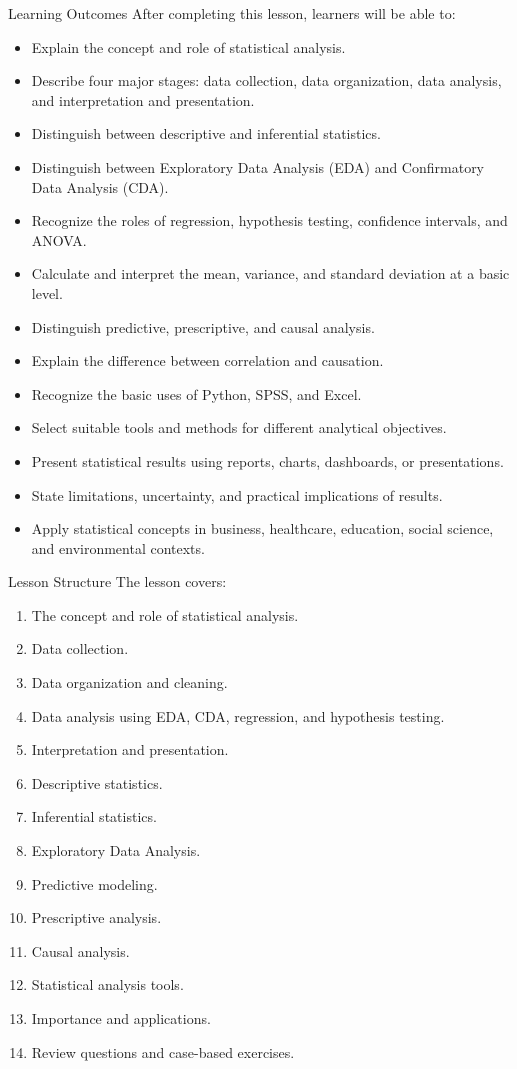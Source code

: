 \documentclass[aspectratio=169,11pt]{beamer}
\begin{document}
\begin{frame}[allowframebreaks]{Learning Outcomes}
\footnotesize
After completing this lesson, learners will be able to:\par\medskip
\begin{itemize}
\item Explain the concept and role of statistical analysis.
\item Describe four major stages: data collection, data organization, data analysis, and interpretation and presentation.
\item Distinguish between descriptive and inferential statistics.
\item Distinguish between Exploratory Data Analysis (EDA) and Confirmatory Data Analysis (CDA).
\item Recognize the roles of regression, hypothesis testing, confidence intervals, and ANOVA.
\item Calculate and interpret the mean, variance, and standard deviation at a basic level.
\item Distinguish predictive, prescriptive, and causal analysis.
\item Explain the difference between correlation and causation.
\item Recognize the basic uses of Python, SPSS, and Excel.
\item Select suitable tools and methods for different analytical objectives.
\item Present statistical results using reports, charts, dashboards, or presentations.
\item State limitations, uncertainty, and practical implications of results.
\item Apply statistical concepts in business, healthcare, education, social science, and environmental contexts.
\end{itemize}
\end{frame}
\begin{frame}[allowframebreaks]{Lesson Structure}
\small
The lesson covers:\par\medskip
\begin{enumerate}
\item The concept and role of statistical analysis.
\item Data collection.
\item Data organization and cleaning.
\item Data analysis using EDA, CDA, regression, and hypothesis testing.
\item Interpretation and presentation.
\item Descriptive statistics.
\item Inferential statistics.
\item Exploratory Data Analysis.
\item Predictive modeling.
\item Prescriptive analysis.
\item Causal analysis.
\item Statistical analysis tools.
\item Importance and applications.
\item Review questions and case-based exercises.
\end{enumerate}
\end{frame}
\end{document}
